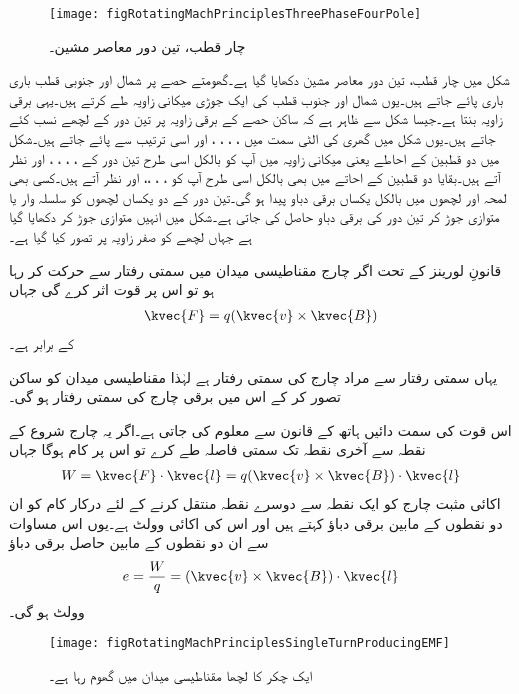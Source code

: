 \begin{figure}
\centering
\texttt{[image: figRotatingMachPrinciplesThreePhaseFourPole]}
\caption{چار قطب، تین دور معاصر مشین۔}
\label{شکل_گھومتے_مشین_چار_قطب_تین_دور_معاصر}
\end{figure}
شکل  میں چار قطب، تین دور معاصر مشین دکھایا گیا ہے۔گھومتے حصے پر شمال اور جنوبی قطب باری باری پائے جاتے ہیں۔یوں شمال اور جنوب قطب کی ایک جوڑی  میکانی زاویہ طے کرتے ہیں۔یہی  برقی زاویہ بنتا ہے۔جیسا شکل  سے ظاہر ہے کہ ساکن حصے کے  برقی زاویہ پر تین دور کے لچھے نسب کئے جاتے ہیں۔یوں شکل  میں گھری کی الٹی سمت میں  ، ، ، ،  اور  اسی ترتیب سے پائے جاتے ہیں۔شکل  میں  دو قطبین کے احاطے یعنی  میکانی زاویہ میں آپ کو بالکل اسی طرح تین دور کے  ، ، ، ،  اور  نظر آتے ہیں۔بقایا دو قطبین کے احاتے میں بھی بالکل اسی طرح آپ کو ، ، ،،  اور  نظر آتے ہیں۔کسی بھی لمحہ  اور  لچھوں میں بالکل یکساں برقی دباو پیدا ہو گی۔تین دور کے دو یکساں لچھوں کو سلسلہ وار یا متوازی جوڑ کر تین دور کی برقی دباو حاصل کی جاتی ہے۔شکل میں انہیں متوازی جوڑ کر دکھایا گیا ہے جہاں  لچھے کو صفر زاویہ پر تصور کیا گیا ہے۔    


قانونِ لورینز کے تحت اگر چارج   مقناطیسی میدان  میں سمتی رفتار  سے حرکت کر رہا ہو تو اس پر قوت   اثر کرے گی  جہاں
\begin{align}
\kvec{F}=q (\kvec{v} \times \kvec{B})
\end{align}
کے برابر ہے۔

یہاں سمتی رفتار سے مراد چارج کی سمتی رفتار ہے لہٰذا مقناطیسی میدان کو ساکن تصور کر کے اس میں برقی چارج کی سمتی رفتار  ہو گی۔

اس قوت کی سمت دائیں ہاتھ کے قانون سے معلوم کی جاتی ہے۔اگر یہ چارج شروع کے نقطہ سے آخری نقطہ تک سمتی فاصلہ   طے کرے تو اس پر  کام ہوگا جہاں
\begin{align}
W=\kvec{F} \cdot \kvec{l}=q (\kvec{v} \times \kvec{B}) \cdot \kvec{l}
\end{align}
اکائی مثبت چارج کو ایک نقطہ سے دوسرے نقطہ منتقل کرنے کے لئے درکار کام کو ان دو نقطوں کے مابین  برقی دباؤ کہتے ہیں اور اس کی اکائی وولٹ   ہے۔یوں اس مساوات سے ان دو نقطوں کے مابین حاصل برقی دباؤ
\begin{align}
e=\frac{W}{q}= (\kvec{v} \times \kvec{B}) \cdot \kvec{l}
\end{align}
وولٹ ہو گی۔
\begin{figure}
\centering
\texttt{[image: figRotatingMachPrinciplesSingleTurnProducingEMF]}
\caption{ایک چکر کا لچھا مقناطیسی میدان میں گھوم رہا ہے۔}
\label{شکل_گھومتے_مشین_ایک_چکر_کی_پیدا_دباو}
\end{figure}

